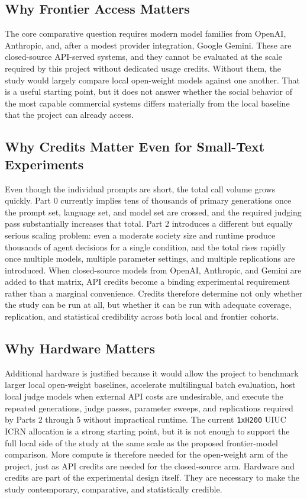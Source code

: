 \documentclass{article}
\begin{document}
\subsection{Why Frontier Access Matters}
The core comparative question requires modern model families from OpenAI, Anthropic, and, after a modest provider integration, Google Gemini. These are closed-source API-served systems, and they cannot be evaluated at the scale required by this project without dedicated usage credits. Without them, the study would largely compare local open-weight models against one another. That is a useful starting point, but it does not answer whether the social behavior of the most capable commercial systems differs materially from the local baseline that the project can already access.

\subsection{Why Credits Matter Even for Small-Text Experiments}
Even though the individual prompts are short, the total call volume grows quickly. Part 0 currently implies tens of thousands of primary generations once the prompt set, language set, and model set are crossed, and the required judging pass substantially increases that total. Part 2 introduces a different but equally serious scaling problem: even a moderate society size and runtime produce thousands of agent decisions for a single condition, and the total rises rapidly once multiple models, multiple parameter settings, and multiple replications are introduced. When closed-source models from OpenAI, Anthropic, and Gemini are added to that matrix, API credits become a binding experimental requirement rather than a marginal convenience. Credits therefore determine not only whether the study can be run at all, but whether it can be run with adequate coverage, replication, and statistical credibility across both local and frontier cohorts.

\subsection{Why Hardware Matters}
Additional hardware is justified because it would allow the project to benchmark larger local open-weight baselines, accelerate multilingual batch evaluation, host local judge models when external API costs are undesirable, and execute the repeated generations, judge passes, parameter sweeps, and replications required by Parts 2 through 5 without impractical runtime. The current \texttt{1xH200} UIUC ICRN allocation is a strong starting point, but it is not enough to support the full local side of the study at the same scale as the proposed frontier-model comparison. More compute is therefore needed for the open-weight arm of the project, just as API credits are needed for the closed-source arm. Hardware and credits are part of the experimental design itself. They are necessary to make the study contemporary, comparative, and statistically credible.
\end{document}
